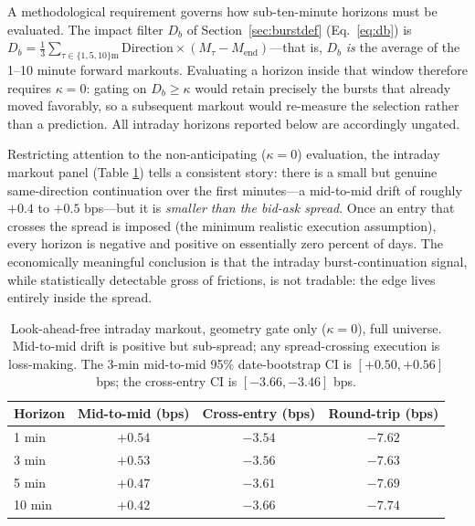 \documentclass[11pt]{article}
\begin{document}
A methodological requirement governs how sub-ten-minute horizons must be evaluated. The impact filter $D_b$ of Section~\ref{sec:burstdef} (Eq.~\ref{eq:db}) is $D_b=\tfrac13\sum_{\tau\in\{1,5,10\}\text{m}}\text{Direction}\times(M_\tau-M_{\text{end}})$---that is, $D_b$ \emph{is} the average of the 1--10 minute forward markouts. Evaluating a horizon inside that window therefore requires $\kappa=0$: gating on $D_b\ge\kappa$ would retain precisely the bursts that already moved favorably, so a subsequent markout would re-measure the selection rather than a prediction. All intraday horizons reported below are accordingly ungated.

Restricting attention to the non-anticipating ($\kappa=0$) evaluation, the intraday markout panel (Table \ref{tab:markout_honest}) tells a consistent story: there is a small but genuine same-direction continuation over the first minutes---a mid-to-mid drift of roughly $+0.4$ to $+0.5$ bps---but it is \emph{smaller than the bid-ask spread}. Once an entry that crosses the spread is imposed (the minimum realistic execution assumption), every horizon is negative and positive on essentially zero percent of days. The economically meaningful conclusion is that the intraday burst-continuation signal, while statistically detectable gross of frictions, is not tradable: the edge lives entirely inside the spread.

\begin{table}[htbp]
\centering
\begin{tabular}{lccc}
\toprule
\textbf{Horizon} & \textbf{Mid-to-mid (bps)} & \textbf{Cross-entry (bps)} & \textbf{Round-trip (bps)} \\
\midrule
1 min  & $+0.54$ & $-3.54$ & $-7.62$ \\
3 min  & $+0.53$ & $-3.56$ & $-7.63$ \\
5 min  & $+0.47$ & $-3.61$ & $-7.69$ \\
10 min & $+0.42$ & $-3.66$ & $-7.74$ \\
\bottomrule
\end{tabular}
\caption{Look-ahead-free intraday markout, geometry gate only ($\kappa=0$), full universe. Mid-to-mid drift is positive but sub-spread; any spread-crossing execution is loss-making. The 3-min mid-to-mid 95\% date-bootstrap CI is $[+0.50,+0.56]$ bps; the cross-entry CI is $[-3.66,-3.46]$ bps.}
\label{tab:markout_honest}
\end{table}
\end{document}

